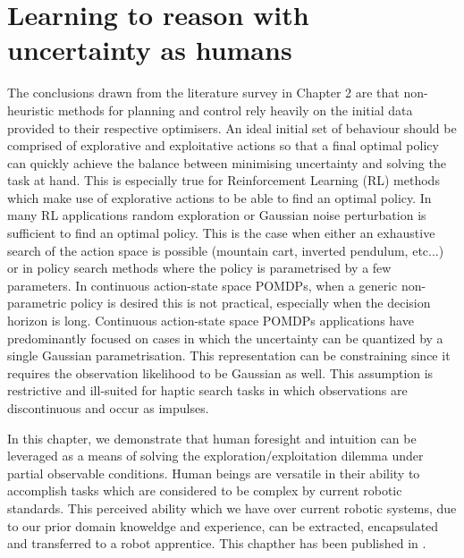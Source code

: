 \chapter{Learning to reason with uncertainty as humans}
%
%
%
The conclusions drawn from the literature survey in Chapter 2 are that non-heuristic methods for planning and control 
rely heavily on the initial data provided to their respective optimisers. An ideal initial set of behaviour should be comprised
of explorative and exploitative actions so that a final optimal policy can quickly achieve the balance between minimising 
uncertainty and solving the task at hand. This is especially true for Reinforcement Learning (RL) methods which make use of 
explorative actions to be able to find an optimal policy. In many RL applications random exploration or Gaussian noise perturbation
is sufficient to find an optimal policy. This is the case when either an exhaustive search of the action space is possible 
(mountain cart, inverted pendulum, etc...) or in policy search methods where the policy is parametrised by a few parameters.
In continuous action-state space POMDPs, when a generic non-parametric policy is desired  this is not practical, especially 
when the decision horizon is long. Continuous action-state space POMDPs applications have predominantly focused on cases in which 
the uncertainty can be quantized by a single Gaussian parametrisation. This representation can be constraining since it requires 
the observation likelihood to be Gaussian as well. This assumption is restrictive and ill-suited for haptic search tasks in 
which observations are discontinuous and occur as impulses. 

In this chapter, we demonstrate that human foresight and intuition can be leveraged as a means of solving the 
exploration/exploitation dilemma under partial observable conditions. Human beings are versatile in their ability to 
accomplish tasks which are considered to be complex by current robotic standards. This perceived ability which we have over 
current robotic systems, due to our prior domain knoweldge and experience, can be extracted, encapsulated and transferred 
to a robot apprentice. This chapther has been published in \cite{deChambrierBillard2013,Chambrier2014}.

